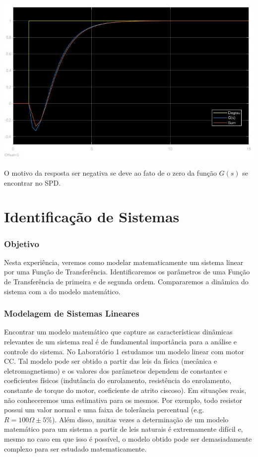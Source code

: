\documentclass[
]{book}
\begin{document}
\includegraphics{Imagens/Lab2/prob6C.jpg}

O motivo da resposta ser negativa se deve ao fato de o zero da função \(G(s)\) se encontrar no SPD.

\hypertarget{identificauxe7uxe3o-de-sistemas}{%
\chapter{Identificação de Sistemas}\label{identificauxe7uxe3o-de-sistemas}}

\hypertarget{objetivo}{%
\subsection*{Objetivo}\label{objetivo}}

Nesta experiência, veremos como modelar matematicamente um sistema linear por uma Função de Transferência. Identificaremos os parâmetros de uma Função de Transferência de primeira e de segunda ordem. Compararemos a dinâmica do sistema com a do modelo matemático.

\hypertarget{modelagem-de-sistemas-lineares}{%
\subsection*{Modelagem de Sistemas Lineares}\label{modelagem-de-sistemas-lineares}}

Encontrar um modelo matemático que capture as características dinâmicas relevantes de um sistema real é de fundamental importância para a análise e controle do sistema. No Laboratório 1 estudamos um modelo linear com motor CC. Tal modelo pode ser obtido a partir das leis da física (mecânica e eletromagnetismo) e os valores dos parâmetros dependem de constantes e coeficientes físicos (indutância do enrolamento, resistência do enrolamento, constante de torque do motor, coeficiente de atrito ciscoso). Em situações reais, não conheceremos uma estimativa para os mesmos. Por exemplo, todo resistor possui um valor normal e uma faixa de tolerância percentual (e.g.~\(R = 100 \Omega \pm 5\%\)). Além disso, muitas vezes a determinação de um modelo matemático para um sistema a partir de leis naturais é extremamente difícil e, mesmo no caso em que isso é possível, o modelo obtido pode ser demasiadamente complexo para ser estudado matematicamente.
\end{document}
